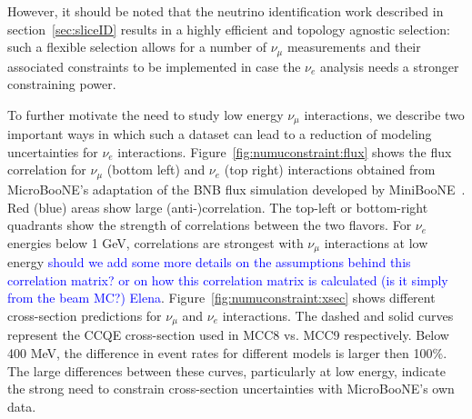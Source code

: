\documentclass[a4paper]{article}
\begin{document}
 However, it should be noted that the neutrino identification work described in section~\ref{sec:sliceID} results in a highly efficient and topology agnostic selection: such a flexible selection allows for a number of $\nu_{\mu}$ measurements and their associated constraints to be implemented in case the $\nu_e$ analysis needs a stronger constraining power. 



\par To further motivate the need to study low energy $\nu_{\mu}$ interactions, we describe two important ways in which such a dataset can lead to a reduction of modeling uncertainties for $\nu_e$ interactions. Figure~\ref{fig:numuconstraint:flux} shows the flux correlation for $\nu_{\mu}$ (bottom left) and $\nu_e$ (top right) interactions obtained from MicroBooNE's adaptation of the BNB flux simulation developed by MiniBooNE~\cite{bib:fluxmcc9,bib:fluxtechnote}. Red (blue) areas show large (anti-)correlation. The top-left or bottom-right quadrants show the strength of correlations between the two flavors. For $\nu_e$ energies below 1 GeV, correlations are strongest with $\nu_{\mu}$ interactions at low energy \textcolor{blue}{should we add some more details on the assumptions behind this correlation matrix? or on how this correlation matrix is calculated (is it simply from the beam MC?) Elena}. Figure~\ref{fig:numuconstraint:xsec} shows different cross-section predictions for $\nu_{\mu}$ and $\nu_e$ interactions. The dashed and solid curves represent the CCQE cross-section used in MCC8 vs. MCC9 respectively. Below 400 MeV, the difference in event rates for different models is larger then 100\%. The large differences between these curves, particularly at low energy, indicate the strong need to constrain cross-section uncertainties with MicroBooNE's own data. 
\end{document}
